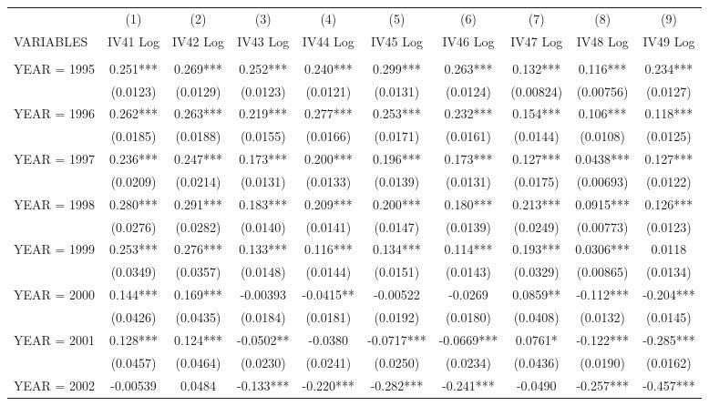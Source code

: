 \begin{tabular}{lccccccccc} \hline
 & (1) & (2) & (3) & (4) & (5) & (6) & (7) & (8) & (9) \\
VARIABLES & IV41 Log & IV42 Log & IV43 Log & IV44 Log & IV45 Log & IV46 Log & IV47 Log & IV48 Log & IV49 Log \\ \hline
 &  &  &  &  &  &  &  &  &  \\
YEAR = 1995 & 0.251*** & 0.269*** & 0.252*** & 0.240*** & 0.299*** & 0.263*** & 0.132*** & 0.116*** & 0.234*** \\
 & (0.0123) & (0.0129) & (0.0123) & (0.0121) & (0.0131) & (0.0124) & (0.00824) & (0.00756) & (0.0127) \\
YEAR = 1996 & 0.262*** & 0.263*** & 0.219*** & 0.277*** & 0.253*** & 0.232*** & 0.154*** & 0.106*** & 0.118*** \\
 & (0.0185) & (0.0188) & (0.0155) & (0.0166) & (0.0171) & (0.0161) & (0.0144) & (0.0108) & (0.0125) \\
YEAR = 1997 & 0.236*** & 0.247*** & 0.173*** & 0.200*** & 0.196*** & 0.173*** & 0.127*** & 0.0438*** & 0.127*** \\
 & (0.0209) & (0.0214) & (0.0131) & (0.0133) & (0.0139) & (0.0131) & (0.0175) & (0.00693) & (0.0122) \\
YEAR = 1998 & 0.280*** & 0.291*** & 0.183*** & 0.209*** & 0.200*** & 0.180*** & 0.213*** & 0.0915*** & 0.126*** \\
 & (0.0276) & (0.0282) & (0.0140) & (0.0141) & (0.0147) & (0.0139) & (0.0249) & (0.00773) & (0.0123) \\
YEAR = 1999 & 0.253*** & 0.276*** & 0.133*** & 0.116*** & 0.134*** & 0.114*** & 0.193*** & 0.0306*** & 0.0118 \\
 & (0.0349) & (0.0357) & (0.0148) & (0.0144) & (0.0151) & (0.0143) & (0.0329) & (0.00865) & (0.0134) \\
YEAR = 2000 & 0.144*** & 0.169*** & -0.00393 & -0.0415** & -0.00522 & -0.0269 & 0.0859** & -0.112*** & -0.204*** \\
 & (0.0426) & (0.0435) & (0.0184) & (0.0181) & (0.0192) & (0.0180) & (0.0408) & (0.0132) & (0.0145) \\
YEAR = 2001 & 0.128*** & 0.124*** & -0.0502** & -0.0380 & -0.0717*** & -0.0669*** & 0.0761* & -0.122*** & -0.285*** \\
 & (0.0457) & (0.0464) & (0.0230) & (0.0241) & (0.0250) & (0.0234) & (0.0436) & (0.0190) & (0.0162) \\
YEAR = 2002 & -0.00539 & 0.0484 & -0.133*** & -0.220*** & -0.282*** & -0.241*** & -0.0490 & -0.257*** & -0.457*** \\

\end{tabular}
